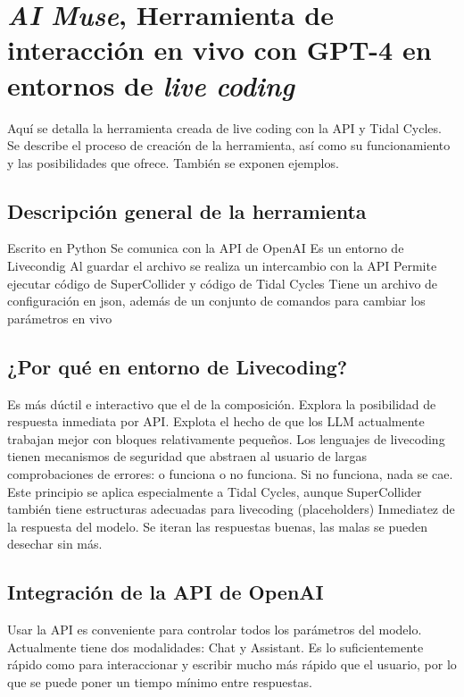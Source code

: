 \chapter{\textit{AI Muse}, Herramienta de interacción en vivo con GPT-4 en entornos de \textit{live coding}}

Aquí se detalla la herramienta creada de live coding con la API y Tidal Cycles. Se describe el proceso de creación de la herramienta, así como su funcionamiento y las posibilidades que ofrece. También se exponen ejemplos.

\section{Descripción general de la herramienta}

Escrito en Python
Se comunica con la API de OpenAI
Es un entorno de Livecondig
Al guardar el archivo se realiza un intercambio con la API
Permite ejecutar código de SuperCollider y código de Tidal Cycles
Tiene un archivo de configuración en json, además de un conjunto de comandos para cambiar los parámetros en vivo

\section{¿Por qué en entorno de Livecoding?}

Es más dúctil e interactivo que el de la composición.
Explora la posibilidad de respuesta inmediata por API.
Explota el hecho de que los LLM actualmente trabajan mejor con bloques relativamente pequeños.
Los lenguajes de livecoding tienen mecanismos de seguridad que abstraen al usuario de largas comprobaciones de errores: o funciona o no funciona. Si no funciona, nada se cae. Este principio se aplica especialmente a Tidal Cycles, aunque SuperCollider también tiene estructuras adecuadas para livecoding (placeholders)
Inmediatez de la respuesta del modelo. Se iteran las respuestas buenas, las malas se pueden desechar sin más.

\section{Integración de la API de OpenAI}

Usar la API es conveniente para controlar todos los parámetros del modelo.
Actualmente tiene dos modalidades: Chat y Assistant.
Es lo suficientemente rápido como para interaccionar y escribir mucho más rápido que el usuario, por lo que se puede poner un tiempo mínimo entre respuestas.



